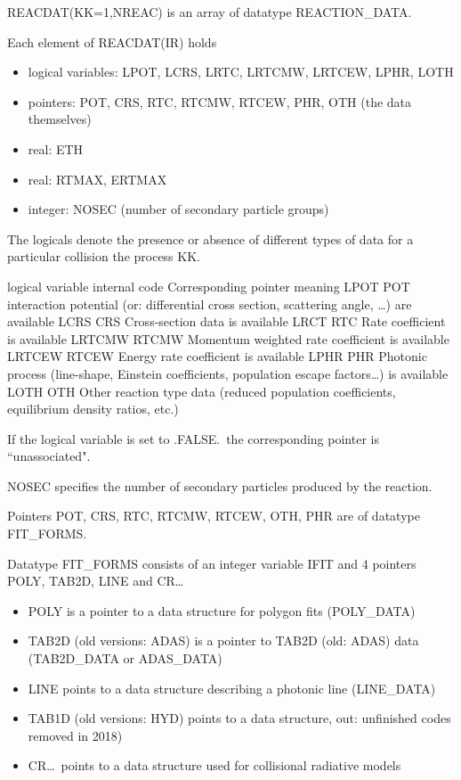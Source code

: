 REACDAT(KK=1,NREAC) is an array of datatype REACTION\_DATA.

Each element of REACDAT(IR) holds
\begin{itemize}
  \item logical variables:
        LPOT, LCRS, LRTC, LRTCMW, LRTCEW,  LPHR, LOTH
  \item pointers:  POT, CRS, RTC,
        RTCMW, RTCEW, PHR, OTH (the data themselves)
  \item real: ETH
  \item real: RTMAX,
        ERTMAX
  \item integer: NOSEC (number of secondary particle groups)
\end{itemize}

The logicals denote the presence or absence of different types of data for a
particular collision the process KK.

logical variable internal code	Corresponding pointer	meaning
LPOT	POT	interaction potential (or: differential cross section,
scattering angle, \dots) are available
LCRS	CRS	Cross-section data is available
LRCT	RTC	Rate coefficient is available
LRTCMW	RTCMW	Momentum weighted rate coefficient is available
LRTCEW	RTCEW	Energy rate coefficient is available
LPHR	PHR	 Photonic process (line-shape, Einstein coefficients,
population escape factors\dots) is available
LOTH	OTH	Other reaction type data (reduced population coefficients,
equilibrium  density ratios, etc.)

If the logical variable is set to .FALSE.\ the corresponding pointer is
``unassociated".

NOSEC specifies the number of secondary particles produced by the reaction.

Pointers POT, CRS, RTC, RTCMW, RTCEW, OTH, PHR are of datatype FIT\_FORMS.

Datatype FIT\_FORMS consists of an integer variable IFIT and 4 pointers POLY,
TAB2D, LINE and CR\dots
\begin{itemize}
  \item POLY is a pointer to a data
        structure for polygon fits (POLY\_DATA)
  \item TAB2D  (old versions: ADAS) is a
        pointer to TAB2D (old: ADAS) data (TAB2D\_DATA or ADAS\_DATA)
  \item LINE points
        to a data structure describing a photonic line (LINE\_DATA)
  \item TAB1D  (old
        versions: HYD) points to a data structure, out: unfinished codes removed in
        2018)
  \item CR\dots\ points to a data structure used for collisional radiative
        models
\end{itemize}

